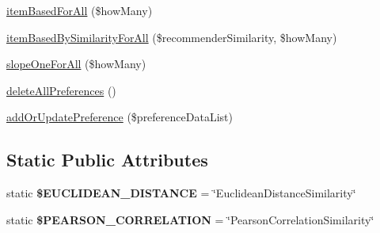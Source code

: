 \begin{DoxyCompactItemize}
\item 
\hyperlink{class_recommender_service_a582e11c8eb97f147b42decbd8489ebba}{item\+Based\+For\+All} (\$how\+Many)
\item 
\hyperlink{class_recommender_service_acf8966b192cb06cc2eda1b44952145a9}{item\+Based\+By\+Similarity\+For\+All} (\$recommender\+Similarity, \$how\+Many)
\item 
\hyperlink{class_recommender_service_a09de61f0c73f9c1ffdca5a8a2707628c}{slope\+One\+For\+All} (\$how\+Many)
\item 
\hyperlink{class_recommender_service_a468ae67c8db20494d0197d4887c5668a}{delete\+All\+Preferences} ()
\item 
\hyperlink{class_recommender_service_a02ab0bbcd370c828014625648116fa9f}{add\+Or\+Update\+Preference} (\$preference\+Data\+List)
\end{DoxyCompactItemize}
\subsection*{Static Public Attributes}
\begin{DoxyCompactItemize}
\item 
\hypertarget{class_recommender_service_a86b935c20acf30139beed35f18dadea0}{static {\bfseries \$\+E\+U\+C\+L\+I\+D\+E\+A\+N\+\_\+\+D\+I\+S\+T\+A\+N\+C\+E} = \char`\"{}Euclidean\+Distance\+Similarity\char`\"{}}\label{class_recommender_service_a86b935c20acf30139beed35f18dadea0}

\item 
\hypertarget{class_recommender_service_a486491a10ef72bb767cff5cc1cd1b6a9}{static {\bfseries \$\+P\+E\+A\+R\+S\+O\+N\+\_\+\+C\+O\+R\+R\+E\+L\+A\+T\+I\+O\+N} = \char`\"{}Pearson\+Correlation\+Similarity\char`\"{}}\label{class_recommender_service_a486491a10ef72bb767cff5cc1cd1b6a9}

\end{DoxyCompactItemize}
